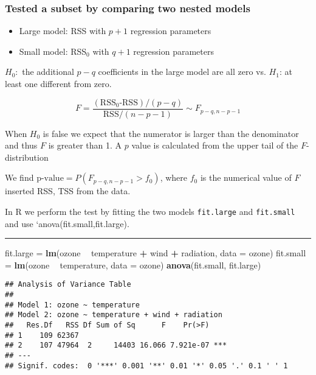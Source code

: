 \documentclass[]{article}
\newenvironment{Shaded}{\begin{snugshade}}{\end{snugshade}}
\newcommand{\DataTypeTok}[1]{\textcolor[rgb]{0.13,0.29,0.53}{#1}}
\newcommand{\KeywordTok}[1]{\textcolor[rgb]{0.13,0.29,0.53}{\textbf{#1}}}
\newcommand{\NormalTok}[1]{#1}
\newcommand{\OperatorTok}[1]{\textcolor[rgb]{0.81,0.36,0.00}{\textbf{#1}}}
\newcommand{\StringTok}[1]{\textcolor[rgb]{0.31,0.60,0.02}{#1}}
\providecommand{\tightlist}{%
  \setlength{\itemsep}{0pt}\setlength{\parskip}{0pt}}
\begin{document}
\hypertarget{tested-a-subset-by-comparing-two-nested-models}{%
\subsubsection{Tested a subset by comparing two nested
models}\label{tested-a-subset-by-comparing-two-nested-models}}

\begin{itemize}
\tightlist
\item
  Large model: RSS with \(p+1\) regression parameters
\item
  Small model: RSS\(_0\) with \(q+1\) regression parameters
\end{itemize}

\(H_0:\) the additional \(p-q\) coefficients in the large model are all
zero vs. \(H_1\): at least one different from zero.

\[F=\frac{(\text{RSS$_0$-RSS})/(p-q)}{\text{RSS}/(n-p-1)} \sim F_{p-q,n-p-1}\]

When \(H_0\) is false we expect that the numerator is larger than the
denominator and thus \(F\) is greater than 1. A \(p\) value is
calculated from the upper tail of the \(F\)-distribution

We find \(\text{p-value}=P(F_{p-q,n-p-1}>f_0)\), where \(f_0\) is the
numerical value of \(F\) inserted RSS, TSS from the data.

In R we perform the test by fitting the two models \texttt{fit.large}
and \texttt{fit.small} and use `anova(fit.small,fit.large).

\begin{center}\rule{0.5\linewidth}{\linethickness}\end{center}

\footnotesize

\begin{Shaded}
\begin{Highlighting}[]
\NormalTok{fit.large =}\StringTok{ }\KeywordTok{lm}\NormalTok{(ozone }\OperatorTok{~}\StringTok{ }\NormalTok{temperature }\OperatorTok{+}\StringTok{ }\NormalTok{wind }\OperatorTok{+}\StringTok{ }\NormalTok{radiation, }\DataTypeTok{data =}\NormalTok{ ozone)}
\NormalTok{fit.small =}\StringTok{ }\KeywordTok{lm}\NormalTok{(ozone }\OperatorTok{~}\StringTok{ }\NormalTok{temperature, }\DataTypeTok{data =}\NormalTok{ ozone)}
\KeywordTok{anova}\NormalTok{(fit.small, fit.large)}
\end{Highlighting}
\end{Shaded}

\begin{verbatim}
## Analysis of Variance Table
## 
## Model 1: ozone ~ temperature
## Model 2: ozone ~ temperature + wind + radiation
##   Res.Df   RSS Df Sum of Sq      F    Pr(>F)    
## 1    109 62367                                  
## 2    107 47964  2     14403 16.066 7.921e-07 ***
## ---
## Signif. codes:  0 '***' 0.001 '**' 0.01 '*' 0.05 '.' 0.1 ' ' 1
\end{verbatim}
\end{document}

